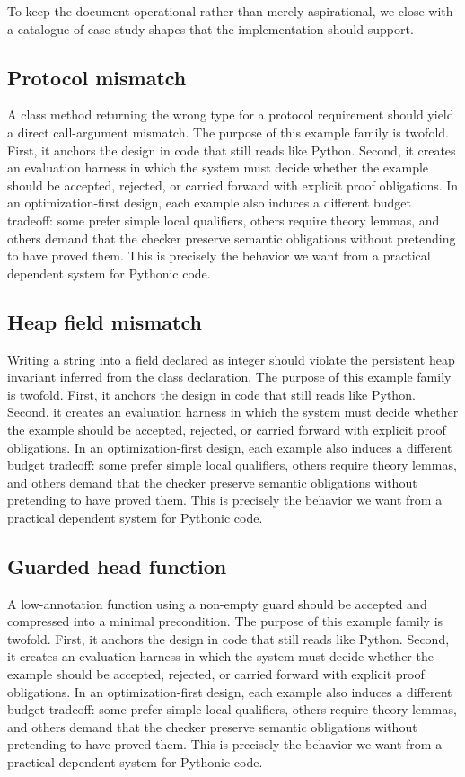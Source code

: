 \documentclass[11pt]{article}
\theoremstyle{definition}
\theoremstyle{plain}
\begin{document}
To keep the document operational rather than merely aspirational, we close with
a catalogue of case-study shapes that the implementation should support.
\subsection{Protocol mismatch}
A class method returning the wrong type for a protocol requirement should yield a direct call-argument mismatch.
The purpose of this example family is twofold. First, it anchors the design in
code that still reads like Python. Second, it creates an evaluation harness in
which the system must decide whether the example should be accepted, rejected,
or carried forward with explicit proof obligations. In an optimization-first
design, each example also induces a different budget tradeoff: some prefer
simple local qualifiers, others require theory lemmas, and others demand that
the checker preserve semantic obligations without pretending to have proved
them. This is precisely the behavior we want from a practical dependent system
for Pythonic code.

\subsection{Heap field mismatch}
Writing a string into a field declared as integer should violate the persistent heap invariant inferred from the class declaration.
The purpose of this example family is twofold. First, it anchors the design in
code that still reads like Python. Second, it creates an evaluation harness in
which the system must decide whether the example should be accepted, rejected,
or carried forward with explicit proof obligations. In an optimization-first
design, each example also induces a different budget tradeoff: some prefer
simple local qualifiers, others require theory lemmas, and others demand that
the checker preserve semantic obligations without pretending to have proved
them. This is precisely the behavior we want from a practical dependent system
for Pythonic code.

\subsection{Guarded head function}
A low-annotation function using a non-empty guard should be accepted and compressed into a minimal precondition.
The purpose of this example family is twofold. First, it anchors the design in
code that still reads like Python. Second, it creates an evaluation harness in
which the system must decide whether the example should be accepted, rejected,
or carried forward with explicit proof obligations. In an optimization-first
design, each example also induces a different budget tradeoff: some prefer
simple local qualifiers, others require theory lemmas, and others demand that
the checker preserve semantic obligations without pretending to have proved
them. This is precisely the behavior we want from a practical dependent system
for Pythonic code.
\end{document}
